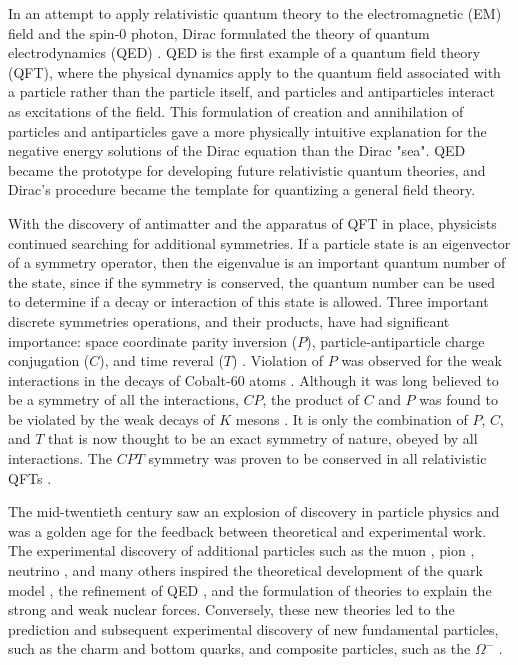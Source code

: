 \indent In an attempt to apply relativistic quantum theory to the electromagnetic (EM) field and the spin-0 photon, Dirac formulated the theory of quantum electrodynamics (QED) \cite{Dirac243}. QED is the first example of a quantum field theory (QFT), where the physical dynamics apply to the quantum field associated with a particle rather than the particle itself, and particles and antiparticles interact as excitations of the field. This formulation of creation and annihilation of particles and antiparticles gave a more physically intuitive explanation for the negative energy solutions of the Dirac equation than the Dirac "sea". QED became the prototype for developing future relativistic quantum theories, and Dirac's procedure became the template for quantizing a general field theory. 

\indent With the discovery of antimatter and the apparatus of QFT in place, physicists continued searching for additional symmetries. If a particle state is an eigenvector of a symmetry operator, then the eigenvalue is an important quantum number of the state, since if the symmetry is conserved, the quantum number can be used to determine if a decay or interaction of this state is allowed. Three important discrete symmetries operations, and their products, have had significant importance: space coordinate parity inversion ($P$), particle-antiparticle charge conjugation ($C$), and time reveral ($T$) \cite{Bettini}. Violation of $P$ was observed for the weak interactions in the decays of Cobalt-60 atoms \cite{PhysRev.105.1413}. Although it was long believed to be a symmetry of all the interactions, $CP$, the product of $C$ and $P$ was found to be violated by the weak decays of $K$ mesons \cite{PhysRevLett.13.138}. It is only the combination of $P$, $C$, and $T$ that is now thought to be an exact symmetry of nature, obeyed by all interactions. The $CPT$ symmetry was proven to be conserved in all relativistic QFTs \cite{PhysRev.82.914, Luders:1954zz}.

\indent The mid-twentieth century saw an explosion of discovery in particle physics and was a golden age for the feedback between theoretical and experimental work. The experimental discovery of additional particles such as the muon \cite{PhysRev.50.263}, pion \cite{Lattes:1947mx}, neutrino \cite{1956Sci...124..103C}, and many others inspired the theoretical development of the quark model \cite{GellMann:1964nj}, the refinement of QED \cite{PhysRev.73.416, PhysRev.74.1439, PhysRev.76.749, PhysRev.76.769, PhysRev.80.440, Tomonaga:1946zz, PhysRev.75.486, PhysRev.75.1736}, and the formulation of theories to explain the strong \cite{GellMann:1964nj, Zweig:1981pd, Zweig:1964jf, PhysRevLett.30.1346, PhysRevD.8.3633} and weak \cite{Fermi:1933jpa} nuclear forces. Conversely, these new theories led to the prediction and subsequent experimental discovery of new fundamental particles, such as the charm \cite{PhysRevLett.33.1406, PhysRevLett.33.1404} and bottom \cite{PhysRevLett.39.252} quarks, and composite particles, such as the $\Omega^-$ \cite{Barnes:1964pd}.

